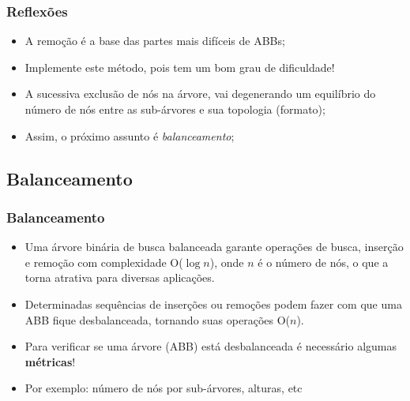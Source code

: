 
\begin{frame}

\frametitle{Reflexões}

\begin{block}{}
\begin{itemize}
  \item A remoção é a base das partes mais difíceis de ABBs;

    \item Implemente este método, pois tem um bom grau de dificuldade!

  \item A sucessiva exclusão de nós na árvore, vai degenerando um 
  equilíbrio do número de nós entre as  sub-árvores e sua
  topologia (formato);
  

  \item Assim, o próximo assunto é \textit{balanceamento};

\end{itemize}
\end{block}

\end{frame}


\subsection{Balanceamento}

\begin{frame}

    \frametitle{Balanceamento}
\begin{block}{}
        
   \begin{itemize}
      \item  Uma árvore binária de busca balanceada garante operações de busca, inserção e
    remoção com complexidade O($\log n$), onde $n$ é o número de nós, o que a torna atrativa  para diversas aplicações.
    
      \item   Determinadas sequências de inserções ou remoções podem fazer com que uma ABB fique  desbalanceada, tornando suas operações O($n$). 

      \item Para verificar se uma árvore (ABB) está desbalanceada é necessário  algumas \textbf{métricas}!
      
      \pause
      \item Por exemplo: número de nós por sub-árvores, alturas, etc
           

    \end{itemize}
    \end{block}
    

\end{frame}


